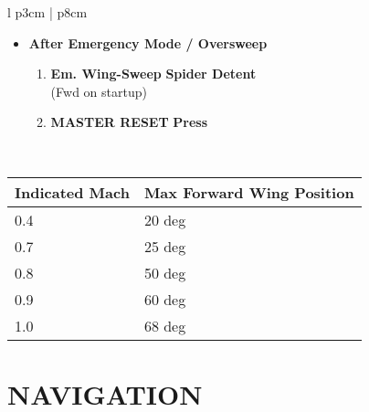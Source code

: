 \documentclass[10pt,usenames,dvipsnames,twoside]{report}
\begin{document}
\begin{center}
\begin{longtable}{l p{3cm} | p{8cm}}
\begin{minipage}[t]{\linewidth}
\begin{itemize}
					\item \textbf{After Emergency Mode / Oversweep}
					\begin{enumerate}
						\item \textbf{Em. Wing-Sweep} \dotfill \textbf{Spider Detent} \\
						\hfill (Fwd on startup)
						\item \textbf{MASTER RESET} \dotfill \textbf{Press}
					\end{enumerate}
				\end{itemize}
			\end{minipage} \\
			\bottomrule
		\end{longtable}
	\end{center}
	\begin{center}
		\begin{tabular}{p{3cm} | p{5cm}}
			\toprule
			\textbf{Indicated Mach} & \textbf{Max Forward Wing Position} \\
			\midrule
			0.4 & 20 deg \\
			\midrule
			0.7 & 25 deg \\
			\midrule
			0.8 & 50 deg \\
			\midrule
			0.9 & 60 deg \\
			\midrule
			1.0 & 68 deg \\
			\bottomrule
		\end{tabular}
	\end{center}

	\clearpage

	\section{NAVIGATION}
\end{document}
